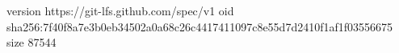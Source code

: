 version https://git-lfs.github.com/spec/v1
oid sha256:7f40f8a7e3b0eb34502a0a68c26c4417411097c8e55d7d2410f1af1f03556675
size 87544
